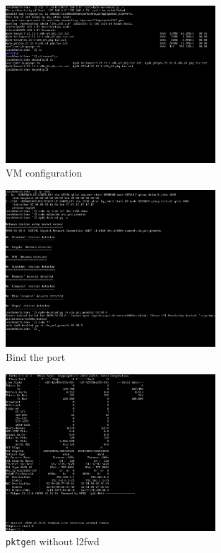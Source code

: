 \documentclass[12pt]{article}
\begin{document}
\begin{figure}[ht]
    \centering
    \includegraphics[width=0.7\textwidth]{figures/config-vm.png}
    \caption{VM configuration}
    \label{fig:config-vm}
\end{figure}

\begin{figure}[ht]
    \centering
    \includegraphics[width=0.7\textwidth]{figures/bind_port.png}
    \caption{Bind the port}
    \label{fig:bind}
\end{figure}

\begin{figure}[ht]
    \centering
    \includegraphics[width=0.7\textwidth]{figures/no-l2fwd.png}
    \caption{\texttt{pktgen} without l2fwd}
    \label{fig:pktgen-no-l2fwd}
\end{figure}
\end{document}
